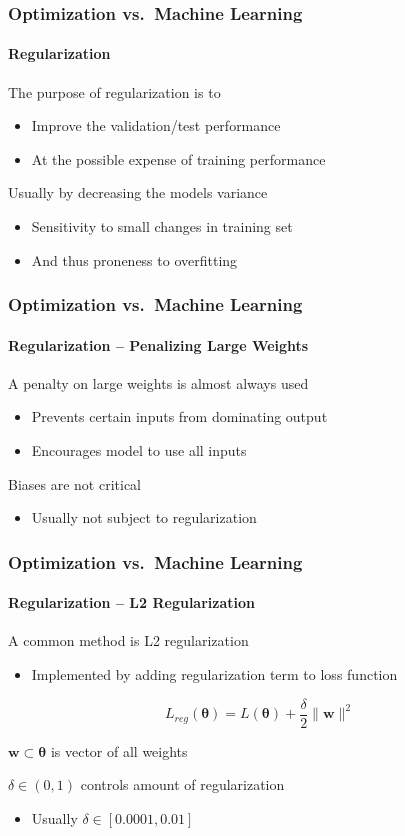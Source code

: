 \documentclass[xetex,professionalfont]{beamer}
\renewcommand\emph[1]{\textcolor{tuwcvl_cvl_blue}{#1}}
\renewcommand{\vec}[1]{\ensuremath{\mathbf{#1}}}
\newcommand{\vw}{\vec{w}}
\newcommand{\bth}{\boldsymbol{\theta}}
\begin{document}
\begin{frame}
	\frametitle{Optimization vs.~Machine Learning}
	\framesubtitle{Regularization}

	The purpose of \emph{regularization} is to
	\begin{itemize}
		\item Improve the validation/test performance
		\item At the possible expense of training performance
	\end{itemize}

	\bigskip

	Usually by decreasing the models \emph{variance}
	\begin{itemize}
		\item Sensitivity to small changes in training set
		\item And thus proneness to overfitting
	\end{itemize}

\end{frame}


\begin{frame}
	\frametitle{Optimization vs.~Machine Learning}
	\framesubtitle{Regularization -- Penalizing Large Weights}

	A penalty on large weights is almost always used
	\begin{itemize}
		\item Prevents certain inputs from dominating output
		\item Encourages model to use all inputs
	\end{itemize}

	\bigskip

	Biases are not critical %
	\begin{itemize}
		\item Usually not subject to regularization
	\end{itemize}

\end{frame}


\begin{frame}
	\frametitle{Optimization vs.~Machine Learning}
	\framesubtitle{Regularization -- L2 Regularization}

	A common method is \emph{L2 regularization}
	\begin{itemize}
		\item Implemented by adding regularization term to loss function
	\end{itemize}

	\[
		L_{reg}(\bth)=L(\bth)+\frac{\delta}{2}\lVert\vw\rVert^2 %
	\]

	\medskip

	$\vw\subset\bth$ is vector of all weights

	\bigskip

	$\delta\in(0,1)$ controls amount of regularization
	\begin{itemize}
		\item Usually $\delta\in[0.0001,0.01]$
	\end{itemize}

\end{frame}
\end{document}
